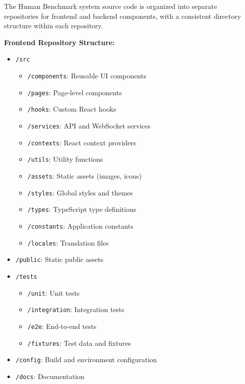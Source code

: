 The Human Benchmark system source code is organized into separate repositories for frontend and backend components, with a consistent directory structure within each repository.

\textbf{Frontend Repository Structure:}
\begin{itemize}
    \item \texttt{/src}
    \begin{itemize}
        \item \texttt{/components}: Reusable UI components
        \item \texttt{/pages}: Page-level components
        \item \texttt{/hooks}: Custom React hooks
        \item \texttt{/services}: API and WebSocket services
        \item \texttt{/contexts}: React context providers
        \item \texttt{/utils}: Utility functions
        \item \texttt{/assets}: Static assets (images, icons)
        \item \texttt{/styles}: Global styles and themes
        \item \texttt{/types}: TypeScript type definitions
        \item \texttt{/constants}: Application constants
        \item \texttt{/locales}: Translation files
    \end{itemize}
    \item \texttt{/public}: Static public assets
    \item \texttt{/tests}
    \begin{itemize}
        \item \texttt{/unit}: Unit tests
        \item \texttt{/integration}: Integration tests
        \item \texttt{/e2e}: End-to-end tests
        \item \texttt{/fixtures}: Test data and fixtures
    \end{itemize}
    \item \texttt{/config}: Build and environment configuration
    \item \texttt{/docs}: Documentation
\end{itemize}

